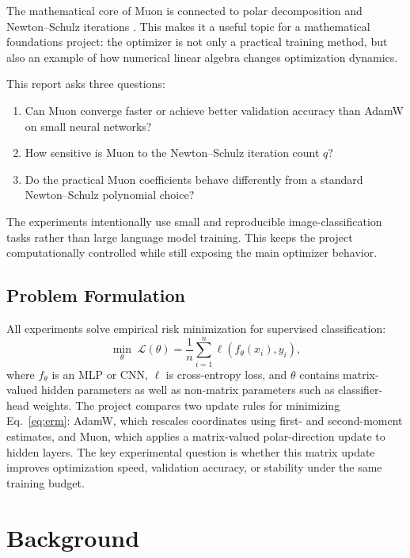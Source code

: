 \documentclass{article}
\begin{document}
The mathematical core of Muon is connected to polar decomposition and Newton--Schulz iterations \citep{higham2008functions,kim2026convergence}. This makes it a useful topic for a mathematical foundations project: the optimizer is not only a practical training method, but also an example of how numerical linear algebra changes optimization dynamics.

This report asks three questions:
\begin{enumerate}
    \item Can Muon converge faster or achieve better validation accuracy than AdamW on small neural networks?
    \item How sensitive is Muon to the Newton--Schulz iteration count $q$?
    \item Do the practical Muon coefficients behave differently from a standard Newton--Schulz polynomial choice?
\end{enumerate}

The experiments intentionally use small and reproducible image-classification tasks rather than large language model training. This keeps the project computationally controlled while still exposing the main optimizer behavior.

\subsection{Problem Formulation}

All experiments solve empirical risk minimization for supervised classification:
\begin{equation}
\min_{\theta}\; \mathcal{L}(\theta)
= \frac{1}{n}\sum_{i=1}^{n}\ell(f_\theta(x_i),y_i),
\label{eq:erm}
\end{equation}
where $f_\theta$ is an MLP or CNN, $\ell$ is cross-entropy loss, and $\theta$ contains matrix-valued hidden parameters as well as non-matrix parameters such as classifier-head weights. The project compares two update rules for minimizing Eq.~\eqref{eq:erm}: AdamW, which rescales coordinates using first- and second-moment estimates, and Muon, which applies a matrix-valued polar-direction update to hidden layers. The key experimental question is whether this matrix update improves optimization speed, validation accuracy, or stability under the same training budget.

\section{Background}
\end{document}
